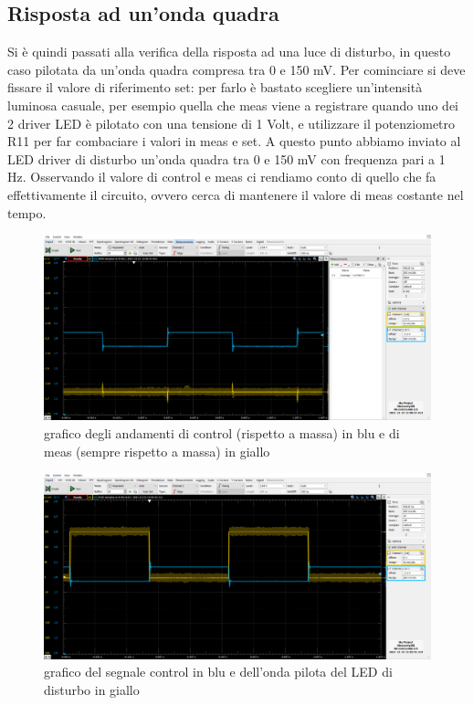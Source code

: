 \documentclass[10pt, a4paper, italian]{article}
\begin{document}
\subsection{Risposta ad un'onda quadra}
Si è quindi passati alla verifica della risposta ad una luce di disturbo, in questo caso pilotata da un'onda quadra compresa tra 0 e 150 mV.
Per cominciare si deve fissare il valore di riferimento set: per farlo è bastato scegliere un'intensità luminosa casuale, per esempio quella che meas viene a registrare quando uno dei 2 driver LED è pilotato con una tensione di 1 Volt, e utilizzare il potenziometro R11 per far combaciare i valori in meas e set.
A questo punto abbiamo inviato al LED driver di disturbo un'onda quadra tra 0 e 150 mV con frequenza pari a 1 Hz.
Osservando il valore di control e meas ci rendiamo conto di quello che fa effettivamente il circuito, ovvero cerca di mantenere il valore di meas costante nel tempo.
\begin{figure}[H]
    \centering
	\includegraphics[scale=0.4]{control7.meas}
    \caption{grafico degli andamenti di control (rispetto a massa) in blu e di meas (sempre rispetto a massa) in giallo
    \label{fig: Draft1}}
\end{figure}
\begin{figure}[H]
    \centering
	\includegraphics[scale=0.4]{control7}
    \caption{grafico del segnale control in blu e dell'onda pilota del LED di disturbo in giallo
    \label{fig: Draft1}}
\end{figure}
\end{document}
